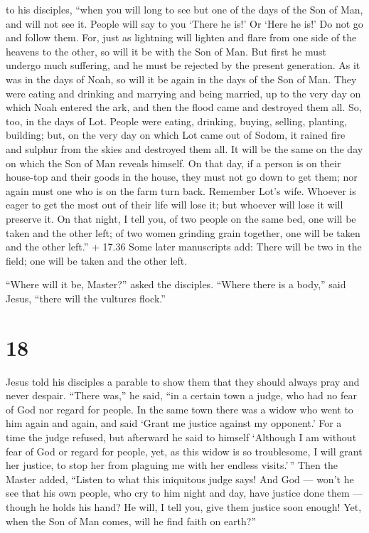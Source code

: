 to his disciples, ``when you will long to see but one of the days of the
Son of Man, and will not see it.  People will say to you
`There he is!' Or `Here he is!' Do not go and follow them. 
For, just as lightning will lighten and flare from one side of the
heavens to the other, so will it be with the Son of Man. 
But first he must undergo much suffering, and he must be rejected by the
present generation.  As it was in the days of Noah, so will
it be again in the days of the Son of Man.  They were
eating and drinking and marrying and being married, up to the very day
on which Noah entered the ark, and then the flood came and destroyed
them all.  So, too, in the days of Lot. People were eating,
drinking, buying, selling, planting, building;  but, on the
very day on which Lot came out of Sodom, it rained fire and sulphur from
the skies and destroyed them all.  It will be the same on
the day on which the Son of Man reveals himself.  On that
day, if a person is on their house-top and their goods in the house,
they must not go down to get them; nor again must one who is on the farm
turn back.  Remember Lot's wife.  Whoever is
eager to get the most out of their life will lose it; but whoever will
lose it will preserve it.  On that night, I tell you, of
two people on the same bed, one will be taken and the other left;
 of two women grinding grain together, one will be taken
and the other left.''  + 17.36 Some later manuscripts add:
There will be two in the field; one will be taken and the other left.

 ``Where will it be, Master?'' asked the disciples. ``Where
there is a body,'' said Jesus, ``there will the vultures flock.''

\hypertarget{section-16}{%
\section{18}\label{section-16}}

 Jesus told his disciples a parable to show them that they
should always pray and never despair.  ``There was,'' he
said, ``in a certain town a judge, who had no fear of God nor regard for
people.  In the same town there was a widow who went to him
again and again, and said `Grant me justice against my opponent.'
 For a time the judge refused, but afterward he said to
himself `Although I am without fear of God or regard for people,
 yet, as this widow is so troublesome, I will grant her
justice, to stop her from plaguing me with her endless visits.'\,''
 Then the Master added, ``Listen to what this iniquitous
judge says!  And God --- won't he see that his own people,
who cry to him night and day, have justice done them --- though he holds
his hand?  He will, I tell you, give them justice soon
enough! Yet, when the Son of Man comes, will he find faith on earth?''

